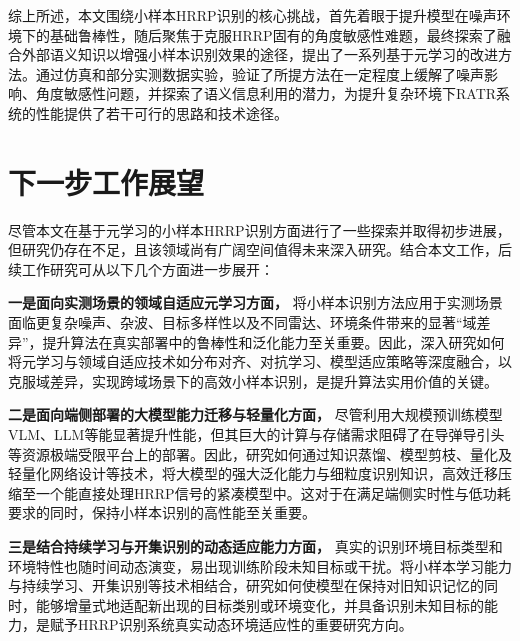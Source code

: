 综上所述，本文围绕小样本HRRP识别的核心挑战，首先着眼于提升模型在噪声环境下的基础鲁棒性，随后聚焦于克服HRRP固有的角度敏感性难题，最终探索了融合外部语义知识以增强小样本识别效果的途径，提出了一系列基于元学习的改进方法。通过仿真和部分实测数据实验，验证了所提方法在一定程度上缓解了噪声影响、角度敏感性问题，并探索了语义信息利用的潜力，为提升复杂环境下RATR系统的性能提供了若干可行的思路和技术途径。

\section{下一步工作展望}
\label{sec}

尽管本文在基于元学习的小样本HRRP识别方面进行了一些探索并取得初步进展，但研究仍存在不足，且该领域尚有广阔空间值得未来深入研究。结合本文工作，后续工作研究可从以下几个方面进一步展开：

\textbf{一是面向实测场景的领域自适应元学习方面，} 将小样本识别方法应用于实测场景面临更复杂噪声、杂波、目标多样性以及不同雷达、环境条件带来的显著“域差异”，提升算法在真实部署中的鲁棒性和泛化能力至关重要。因此，深入研究如何将元学习与领域自适应技术如分布对齐、对抗学习、模型适应策略等深度融合，以克服域差异，实现跨域场景下的高效小样本识别，是提升算法实用价值的关键。

\textbf{二是面向端侧部署的大模型能力迁移与轻量化方面，} 尽管利用大规模预训练模型VLM、LLM等能显著提升性能，但其巨大的计算与存储需求阻碍了在导弹导引头等资源极端受限平台上的部署。因此，研究如何通过知识蒸馏、模型剪枝、量化及轻量化网络设计等技术，将大模型的强大泛化能力与细粒度识别知识，高效迁移压缩至一个能直接处理HRRP信号的紧凑模型中。这对于在满足端侧实时性与低功耗要求的同时，保持小样本识别的高性能至关重要。

\textbf{三是结合持续学习与开集识别的动态适应能力方面， }真实的识别环境目标类型和环境特性也随时间动态演变，易出现训练阶段未知目标或干扰。将小样本学习能力与持续学习、开集识别等技术相结合，研究如何使模型在保持对旧知识记忆的同时，能够增量式地适配新出现的目标类别或环境变化，并具备识别未知目标的能力，是赋予HRRP识别系统真实动态环境适应性的重要研究方向。